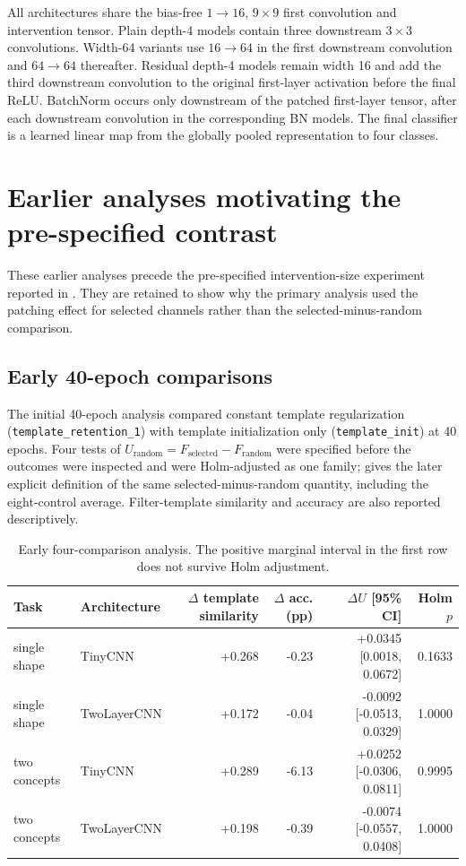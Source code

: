 All architectures share the bias-free $1\!\to\!16$, $9\times9$ first convolution and intervention tensor. Plain depth-4 models contain three downstream $3\times3$ convolutions. Width-64 variants use $16\!\to\!64$ in the first downstream convolution and $64\!\to\!64$ thereafter. Residual depth-4 models remain width 16 and add the third downstream convolution to the original first-layer activation before the final ReLU. BatchNorm occurs only downstream of the patched first-layer tensor, after each downstream convolution in the corresponding BN models. The final classifier is a learned linear map from the globally pooled representation to four classes.

\section{Earlier analyses motivating the pre-specified contrast}\label{app:historical}

These earlier analyses precede the pre-specified intervention-size experiment reported in . They are retained to show why the primary analysis used the patching effect for selected channels rather than the selected-minus-random comparison.

\subsection{Early 40-epoch comparisons}\label{app:development-early}

The initial 40-epoch analysis compared constant template regularization (\texttt{template\_retention\_1}) with template initialization only (\texttt{template\_init}) at 40 epochs. Four tests of $U_{\mathrm{random}}=F_{\mathrm{selected}}-F_{\mathrm{random}}$ were specified before the outcomes were inspected and were Holm-adjusted as one family;  gives the later explicit definition of the same selected-minus-random quantity, including the eight-control average. Filter-template similarity and accuracy are also reported descriptively.

\begin{table}[h]
\caption{Early four-comparison analysis. The positive marginal interval in the first row does not survive Holm adjustment.}
\label{tab:development-early}
\centering
\small
\setlength{\tabcolsep}{3pt}
\begin{tabular}{llrrrr}
\toprule
Task & Architecture & $\Delta$ template similarity & $\Delta$ acc. (pp) & $\Delta U$ [95\% CI] & Holm $p$ \\
\midrule
single shape & TinyCNN & +0.268 & -0.23 & +0.0345 [0.0018, 0.0672] & 0.1633 \\
single shape & TwoLayerCNN & +0.172 & -0.04 & -0.0092 [-0.0513, 0.0329] & 1.0000 \\
two concepts & TinyCNN & +0.289 & -6.13 & +0.0252 [-0.0306, 0.0811] & 0.9995 \\
two concepts & TwoLayerCNN & +0.198 & -0.39 & -0.0074 [-0.0557, 0.0408] & 1.0000 \\
\bottomrule
\end{tabular}
\end{table}

